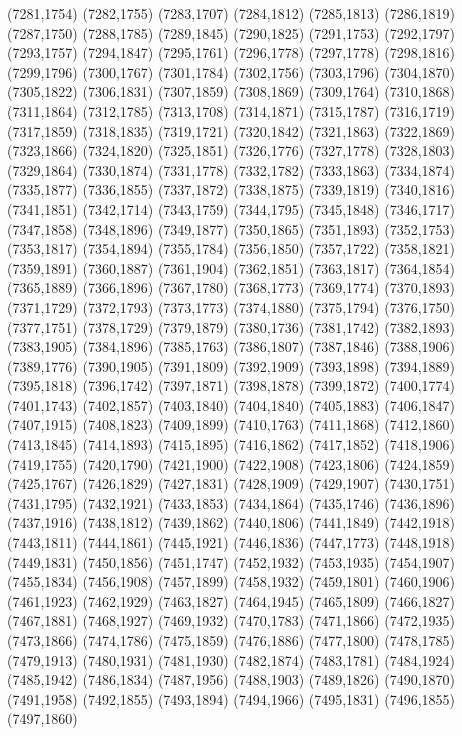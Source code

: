(7281,1754)
(7282,1755)
(7283,1707)
(7284,1812)
(7285,1813)
(7286,1819)
(7287,1750)
(7288,1785)
(7289,1845)
(7290,1825)
(7291,1753)
(7292,1797)
(7293,1757)
(7294,1847)
(7295,1761)
(7296,1778)
(7297,1778)
(7298,1816)
(7299,1796)
(7300,1767)
(7301,1784)
(7302,1756)
(7303,1796)
(7304,1870)
(7305,1822)
(7306,1831)
(7307,1859)
(7308,1869)
(7309,1764)
(7310,1868)
(7311,1864)
(7312,1785)
(7313,1708)
(7314,1871)
(7315,1787)
(7316,1719)
(7317,1859)
(7318,1835)
(7319,1721)
(7320,1842)
(7321,1863)
(7322,1869)
(7323,1866)
(7324,1820)
(7325,1851)
(7326,1776)
(7327,1778)
(7328,1803)
(7329,1864)
(7330,1874)
(7331,1778)
(7332,1782)
(7333,1863)
(7334,1874)
(7335,1877)
(7336,1855)
(7337,1872)
(7338,1875)
(7339,1819)
(7340,1816)
(7341,1851)
(7342,1714)
(7343,1759)
(7344,1795)
(7345,1848)
(7346,1717)
(7347,1858)
(7348,1896)
(7349,1877)
(7350,1865)
(7351,1893)
(7352,1753)
(7353,1817)
(7354,1894)
(7355,1784)
(7356,1850)
(7357,1722)
(7358,1821)
(7359,1891)
(7360,1887)
(7361,1904)
(7362,1851)
(7363,1817)
(7364,1854)
(7365,1889)
(7366,1896)
(7367,1780)
(7368,1773)
(7369,1774)
(7370,1893)
(7371,1729)
(7372,1793)
(7373,1773)
(7374,1880)
(7375,1794)
(7376,1750)
(7377,1751)
(7378,1729)
(7379,1879)
(7380,1736)
(7381,1742)
(7382,1893)
(7383,1905)
(7384,1896)
(7385,1763)
(7386,1807)
(7387,1846)
(7388,1906)
(7389,1776)
(7390,1905)
(7391,1809)
(7392,1909)
(7393,1898)
(7394,1889)
(7395,1818)
(7396,1742)
(7397,1871)
(7398,1878)
(7399,1872)
(7400,1774)
(7401,1743)
(7402,1857)
(7403,1840)
(7404,1840)
(7405,1883)
(7406,1847)
(7407,1915)
(7408,1823)
(7409,1899)
(7410,1763)
(7411,1868)
(7412,1860)
(7413,1845)
(7414,1893)
(7415,1895)
(7416,1862)
(7417,1852)
(7418,1906)
(7419,1755)
(7420,1790)
(7421,1900)
(7422,1908)
(7423,1806)
(7424,1859)
(7425,1767)
(7426,1829)
(7427,1831)
(7428,1909)
(7429,1907)
(7430,1751)
(7431,1795)
(7432,1921)
(7433,1853)
(7434,1864)
(7435,1746)
(7436,1896)
(7437,1916)
(7438,1812)
(7439,1862)
(7440,1806)
(7441,1849)
(7442,1918)
(7443,1811)
(7444,1861)
(7445,1921)
(7446,1836)
(7447,1773)
(7448,1918)
(7449,1831)
(7450,1856)
(7451,1747)
(7452,1932)
(7453,1935)
(7454,1907)
(7455,1834)
(7456,1908)
(7457,1899)
(7458,1932)
(7459,1801)
(7460,1906)
(7461,1923)
(7462,1929)
(7463,1827)
(7464,1945)
(7465,1809)
(7466,1827)
(7467,1881)
(7468,1927)
(7469,1932)
(7470,1783)
(7471,1866)
(7472,1935)
(7473,1866)
(7474,1786)
(7475,1859)
(7476,1886)
(7477,1800)
(7478,1785)
(7479,1913)
(7480,1931)
(7481,1930)
(7482,1874)
(7483,1781)
(7484,1924)
(7485,1942)
(7486,1834)
(7487,1956)
(7488,1903)
(7489,1826)
(7490,1870)
(7491,1958)
(7492,1855)
(7493,1894)
(7494,1966)
(7495,1831)
(7496,1855)
(7497,1860)
